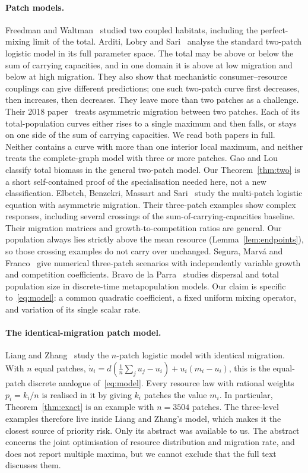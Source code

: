 \documentclass[11pt]{article}
\theoremstyle{remark}
\begin{document}
\paragraph{Patch models.}
Freedman and Waltman~\cite{FreedmanWaltman1977} studied two coupled
habitats, including the perfect-mixing limit of the total. Arditi, Lobry
and Sari~\cite{ArditiLobrySari2015} analyse the standard two-patch
logistic model in its full parameter space. The total may be above or
below the sum of carrying capacities, and in one domain it is above at
low migration and below at high migration. They also show that
mechanistic consumer--resource couplings can give different predictions;
one such two-patch curve first decreases, then increases, then decreases.
They leave more than two patches as a challenge. Their 2018
paper~\cite{ArditiLobrySari2018} treats asymmetric migration between two
patches. Each of its total-population curves either rises to a single
maximum and then falls, or stays on one side of the sum of carrying
capacities. We read both papers in full. Neither contains a curve with
more than one interior local maximum, and neither treats the
complete-graph model with three or more patches. Gao and
Lou~\cite{GaoLou2022} classify total biomass in the general two-patch
model. Our Theorem~\ref{thm:two} is a short self-contained proof of the
specialisation needed here, not a new classification. Elbetch, Benzekri,
Massart and Sari~\cite{ElbetchEtAl2022} study the multi-patch logistic
equation with asymmetric migration. Their three-patch examples show
complex responses, including several crossings of the
sum-of-carrying-capacities baseline. Their migration matrices and
growth-to-competition ratios are general. Our population always lies
strictly above the mean resource (Lemma~\ref{lem:endpoints}), so those
crossing examples do not carry over unchanged. Segura, Marv\'a and
Franco~\cite{SeguraEtAl2026} give numerical three-patch scenarios with
independently variable growth and competition coefficients. Bravo de la
Parra~\cite{BravoDeLaParra2026} studies dispersal and total population
size in discrete-time metapopulation models. Our claim is specific
to~\eqref{eq:model}: a common quadratic coefficient, a fixed uniform
mixing operator, and variation of its single scalar rate.

\paragraph{The identical-migration patch model.}
Liang and Zhang~\cite{LiangZhang2021} study the \(n\)-patch logistic model
with identical migration. With \(n\) equal patches,
\(\dot u_i=d(\frac1n\sum_ju_j-u_i)+u_i(m_i-u_i)\), this is the equal-patch
discrete analogue of~\eqref{eq:model}. Every resource law with rational
weights \(p_i=k_i/n\) is realised in it by giving \(k_i\) patches the
value \(m_i\). In particular, Theorem~\ref{thm:exact} is an example with
\(n=3504\) patches. The three-level examples therefore live inside
Liang and Zhang's model, which makes it the closest source of priority
risk. Only its abstract was available to us. The abstract concerns the
joint optimisation of resource distribution and migration rate, and does
not report multiple maxima, but we cannot exclude that the full text
discusses them.
\end{document}
